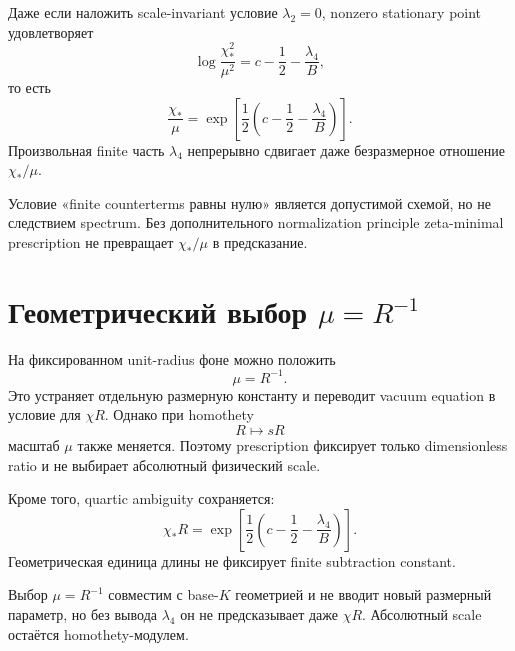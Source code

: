 Даже если наложить scale-invariant условие \(\lambda_2=0\), nonzero
stationary point удовлетворяет
\begin{equation}
 \log\frac{\chi_*^2}{\mu^2}
 =
 c-\frac12-\frac{\lambda_4}{B},
\end{equation}
то есть
\begin{equation}
 \frac{\chi_*}{\mu}
 =
 \exp\left[
 \frac12
 \left(
 c-\frac12-\frac{\lambda_4}{B}
 \right)
 \right].
\end{equation}
Произвольная finite часть \(\lambda_4\) непрерывно сдвигает даже
безразмерное отношение \(\chi_*/\mu\).

\begin{nogocriterion}
Условие «finite counterterms равны нулю» является допустимой схемой, но
не следствием spectrum. Без дополнительного normalization principle
zeta-minimal prescription не превращает \(\chi_*/\mu\) в предсказание.
\end{nogocriterion}

\section{Геометрический выбор \(\mu=R^{-1}\)}

На фиксированном unit-radius фоне можно положить
\begin{equation}
 \mu=R^{-1}.
\end{equation}
Это устраняет отдельную размерную константу и переводит vacuum equation в
условие для \(\chi R\). Однако при homothety
\begin{equation}
 R\longmapsto sR
\end{equation}
масштаб \(\mu\) также меняется. Поэтому prescription фиксирует только
dimensionless ratio и не выбирает абсолютный физический scale.

Кроме того, quartic ambiguity сохраняется:
\begin{equation}
 \chi_*R
 =
 \exp\left[
 \frac12
 \left(
 c-\frac12-\frac{\lambda_4}{B}
 \right)
 \right].
\end{equation}
Геометрическая единица длины не фиксирует finite subtraction constant.

\begin{proposition}
Выбор \(\mu=R^{-1}\) совместим с base-\(K\) геометрией и не вводит новый
размерный параметр, но без вывода \(\lambda_4\) он не предсказывает даже
\(\chi R\). Абсолютный scale остаётся homothety-модулем.
\end{proposition}

